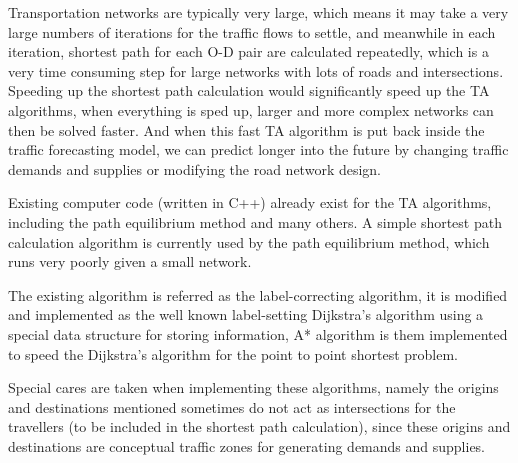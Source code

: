 Transportation networks are typically very large,
which means it may take a very large numbers of iterations
for the traffic flows to settle,
and meanwhile in each iteration,
shortest path for each O-D pair are calculated repeatedly,
which is a very time consuming step for large networks with lots of roads and intersections.
Speeding up the shortest path calculation would significantly speed up the TA algorithms,
when everything is sped up,
larger and more complex networks can then be solved faster.
And when this fast TA algorithm is put back inside the traffic forecasting model,
we can predict longer into the future by changing traffic demands and supplies or modifying the road network design.

Existing computer code (written in C++) already exist for the TA algorithms,
including the path equilibrium method and many others.
A simple shortest path calculation algorithm is currently used by the path equilibrium method,
which runs very poorly given a small network.

The existing algorithm is referred as the label-correcting algorithm, 
it is modified and implemented as the well known label-setting Dijkstra's algorithm using a special data structure for storing information,
A* algorithm is them implemented to speed the Dijkstra's algorithm for the point to point shortest problem.

Special cares are taken when implementing these algorithms,
namely the origins and destinations mentioned sometimes do not act as intersections for the travellers (to be included in the shortest path calculation),
since these origins and destinations are conceptual traffic zones for generating demands and supplies.
